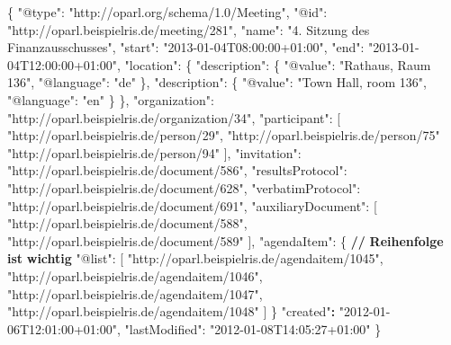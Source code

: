 \documentclass[,a4paper]{article}
\newenvironment{Shaded}{}{}
\newcommand{\DataTypeTok}[1]{\textcolor[rgb]{0.56,0.13,0.00}{{#1}}}
\newcommand{\StringTok}[1]{\textcolor[rgb]{0.25,0.44,0.63}{{#1}}}
\newcommand{\ErrorTok}[1]{\textcolor[rgb]{1.00,0.00,0.00}{\textbf{{#1}}}}
\newcommand{\NormalTok}[1]{{#1}}
\begin{document}
\begin{Shaded}
\begin{Highlighting}[]
\NormalTok{\{}
    \DataTypeTok{"@type"}\NormalTok{: }\StringTok{"http://oparl.org/schema/1.0/Meeting"}\NormalTok{,}
    \DataTypeTok{"@id"}\NormalTok{: }\StringTok{"http://oparl.beispielris.de/meeting/281"}\NormalTok{,}
    \DataTypeTok{"name"}\NormalTok{: }\StringTok{"4. Sitzung des Finanzausschusses"}\NormalTok{,}
    \DataTypeTok{"start"}\NormalTok{: }\StringTok{"2013-01-04T08:00:00+01:00"}\NormalTok{,}
    \DataTypeTok{"end"}\NormalTok{: }\StringTok{"2013-01-04T12:00:00+01:00"}\NormalTok{,}
    \DataTypeTok{"location"}\NormalTok{: \{}
        \DataTypeTok{"description"}\NormalTok{: \{}
            \DataTypeTok{"@value"}\NormalTok{: }\StringTok{"Rathaus, Raum 136"}\NormalTok{,}
            \DataTypeTok{"@language"}\NormalTok{: }\StringTok{"de"}
        \NormalTok{\},}
        \DataTypeTok{"description"}\NormalTok{: \{}
            \DataTypeTok{"@value"}\NormalTok{: }\StringTok{"Town Hall, room 136"}\NormalTok{,}
            \DataTypeTok{"@language"}\NormalTok{: }\StringTok{"en"}
        \NormalTok{\}}
    \NormalTok{\},}
    \DataTypeTok{"organization"}\NormalTok{: }\StringTok{"http://oparl.beispielris.de/organization/34"}\NormalTok{,}
    \DataTypeTok{"participant"}\NormalTok{: [}
        \StringTok{"http://oparl.beispielris.de/person/29"}\NormalTok{,}
        \StringTok{"http://oparl.beispielris.de/person/75"}
        \StringTok{"http://oparl.beispielris.de/person/94"}
    \NormalTok{],}
    \DataTypeTok{"invitation"}\NormalTok{: }\StringTok{"http://oparl.beispielris.de/document/586"}\NormalTok{,}
    \DataTypeTok{"resultsProtocol"}\NormalTok{: }\StringTok{"http://oparl.beispielris.de/document/628"}\NormalTok{,}
    \DataTypeTok{"verbatimProtocol"}\NormalTok{: }\StringTok{"http://oparl.beispielris.de/document/691"}\NormalTok{,}
    \DataTypeTok{"auxiliaryDocument"}\NormalTok{: [}
        \StringTok{"http://oparl.beispielris.de/document/588"}\NormalTok{,}
        \StringTok{"http://oparl.beispielris.de/document/589"}
    \NormalTok{],}
    \DataTypeTok{"agendaItem"}\NormalTok{: \{}
    \ErrorTok{//} \ErrorTok{Reihenfolge} \ErrorTok{ist} \ErrorTok{wichtig}
        \DataTypeTok{"@list"}\NormalTok{: [}
            \StringTok{"http://oparl.beispielris.de/agendaitem/1045"}\NormalTok{,}
            \StringTok{"http://oparl.beispielris.de/agendaitem/1046"}\NormalTok{,}
            \StringTok{"http://oparl.beispielris.de/agendaitem/1047"}\NormalTok{,}
            \StringTok{"http://oparl.beispielris.de/agendaitem/1048"}
        \NormalTok{]}
    \NormalTok{\}}
    \StringTok{"created"}\ErrorTok{:} \StringTok{"2012-01-06T12:01:00+01:00"}\NormalTok{,}
    \DataTypeTok{"lastModified"}\NormalTok{: }\StringTok{"2012-01-08T14:05:27+01:00"}
\NormalTok{\}}
\end{Highlighting}
\end{Shaded}
\end{document}
